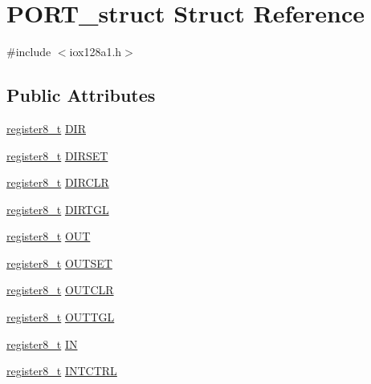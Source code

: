 \hypertarget{struct_p_o_r_t__struct}{
\section{PORT\_\-struct Struct Reference}
\label{struct_p_o_r_t__struct}
}


{\ttfamily \#include $<$iox128a1.h$>$}

\subsection*{Public Attributes}
\begin{DoxyCompactItemize}
\item 
\hyperlink{iox128a1_8h_a6a0649252b392263406882923b04a9db}{register8\_\-t} \hyperlink{struct_p_o_r_t__struct_ae70ac724d575f7902ceadd5af7ec3163}{DIR}
\item 
\hyperlink{iox128a1_8h_a6a0649252b392263406882923b04a9db}{register8\_\-t} \hyperlink{struct_p_o_r_t__struct_a3c0d316f069740be22c224189546b8d5}{DIRSET}
\item 
\hyperlink{iox128a1_8h_a6a0649252b392263406882923b04a9db}{register8\_\-t} \hyperlink{struct_p_o_r_t__struct_a7459f47076d9cf3f8581c8a1410f3f6a}{DIRCLR}
\item 
\hyperlink{iox128a1_8h_a6a0649252b392263406882923b04a9db}{register8\_\-t} \hyperlink{struct_p_o_r_t__struct_a4199abf82b32e254b4021486513847b9}{DIRTGL}
\item 
\hyperlink{iox128a1_8h_a6a0649252b392263406882923b04a9db}{register8\_\-t} \hyperlink{struct_p_o_r_t__struct_a8b4f091f44c465de85b5dd22dc45635a}{OUT}
\item 
\hyperlink{iox128a1_8h_a6a0649252b392263406882923b04a9db}{register8\_\-t} \hyperlink{struct_p_o_r_t__struct_a379bcc66956595a85e2b9eb2a7f8d35d}{OUTSET}
\item 
\hyperlink{iox128a1_8h_a6a0649252b392263406882923b04a9db}{register8\_\-t} \hyperlink{struct_p_o_r_t__struct_aada5adbe29b3eb8bcd743f4011ed016a}{OUTCLR}
\item 
\hyperlink{iox128a1_8h_a6a0649252b392263406882923b04a9db}{register8\_\-t} \hyperlink{struct_p_o_r_t__struct_aff2002aa5bf8c2f30663e4cad161cfe9}{OUTTGL}
\item 
\hyperlink{iox128a1_8h_a6a0649252b392263406882923b04a9db}{register8\_\-t} \hyperlink{struct_p_o_r_t__struct_aa21f12a291d825910a470ef824478ed3}{IN}
\item 
\hyperlink{iox128a1_8h_a6a0649252b392263406882923b04a9db}{register8\_\-t} \hyperlink{struct_p_o_r_t__struct_ae2af35ee5bffe8418119b9335781c980}{INTCTRL}

\end{DoxyCompactItemize}
